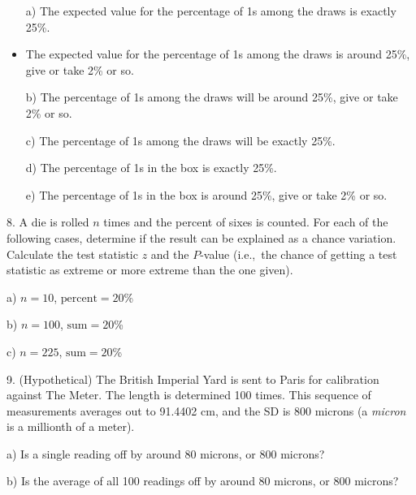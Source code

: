 \documentclass[10pt]{article}
\begin{document}
\begin{itemize}
\item[a)] The expected value for the percentage of 1s among the draws is exactly 25\%.\\
\item The expected value for the percentage of 1s among the draws is around 25\%, give
or take 2\% or so.\\
\item[b)] The percentage of 1s among the draws will be around 25\%, give or take 2\% or so.\\
\item[c)] The percentage of 1s among the draws will be exactly 25\%.\\
\item[d)] The percentage of 1s in the box is exactly 25\%.\\
\item[e)] The percentage of 1s in the box is around 25\%, give or take 2\% or so.
\end{itemize}

\vfill
\eject

8. A die is rolled $n$ times and the percent of sixes is counted.
For each of the following cases, determine if the result can be explained as a chance
variation.  Calculate the test statistic $z$ and the $P$-value
(i.e.,~the chance of getting a test statistic 
  as extreme or more extreme than the one given).

\hspace{10pt} a) $n=10$, $\mbox{percent}=20$\%
\vspace{1.75in}

\hspace{10pt} b) $n=100$, $\mbox{sum}=20$\%
\vspace{1.75in}

\hspace{10pt} c) $n=225$, $\mbox{sum}=20$\%
\vspace{1.75in}

9. (Hypothetical)  The British Imperial Yard is sent to Paris for calibration
against The Meter.  The length is determined 100 times.  This sequence of
measurements averages out to 91.4402 cm, and the SD is 800 microns (a \textit{micron}
is a millionth of a meter).

\hspace{10pt} a) Is a single reading off by around 80 microns, or 800 microns?
\bigskip\bigskip

\hspace{10pt} b) Is the average of all 100 readings off by around 80 microns, or 800 microns?
\bigskip\bigskip
\end{document}
